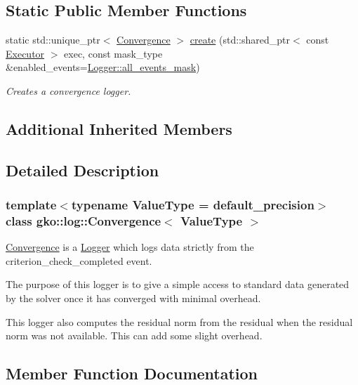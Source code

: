 \subsection*{Static Public Member Functions}
\begin{DoxyCompactItemize}
\item 
static std\+::unique\+\_\+ptr$<$ \hyperlink{classgko_1_1log_1_1Convergence}{Convergence} $>$ \hyperlink{classgko_1_1log_1_1Convergence_ad46f4f47f7392125e921d483a556017d}{create} (std\+::shared\+\_\+ptr$<$ const \hyperlink{classgko_1_1Executor}{Executor} $>$ exec, const mask\+\_\+type \&enabled\+\_\+events=\hyperlink{classgko_1_1log_1_1Logger_a02534863a2d2f92dfeb2c39038365532}{Logger\+::all\+\_\+events\+\_\+mask})
\begin{DoxyCompactList}\small\item\em Creates a convergence logger. \end{DoxyCompactList}\end{DoxyCompactItemize}
\subsection*{Additional Inherited Members}


\subsection{Detailed Description}
\subsubsection*{template$<$typename Value\+Type = default\+\_\+precision$>$\newline
class gko\+::log\+::\+Convergence$<$ Value\+Type $>$}

\hyperlink{classgko_1_1log_1_1Convergence}{Convergence} is a \hyperlink{classgko_1_1log_1_1Logger}{Logger} which logs data strictly from the {\ttfamily criterion\+\_\+check\+\_\+completed} event. 

The purpose of this logger is to give a simple access to standard data generated by the solver once it has converged with minimal overhead.

This logger also computes the residual norm from the residual when the residual norm was not available. This can add some slight overhead. 

\subsection{Member Function Documentation}
\mbox{\label{classgko_1_1log_1_1Convergence_ad46f4f47f7392125e921d483a556017d}} 
